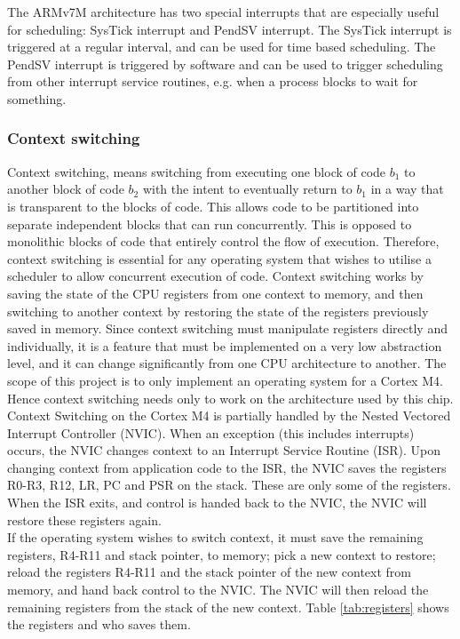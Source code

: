 The ARMv7M architecture has two special interrupts that are especially useful
for scheduling: SysTick interrupt and PendSV interrupt. The SysTick interrupt is
triggered at a regular interval, and can be used for time based scheduling. The
PendSV interrupt is triggered by software and can be used to trigger
scheduling from other interrupt service routines, e.g. when a process blocks to
wait for something.


\subsubsection{Context switching}
Context switching, means switching from executing one block of code $b_1$ to another block of code $b_2$
with the intent to eventually return to $b_1$ in a way that is transparent to the blocks of code.
This allows code to be partitioned into separate independent blocks that can run concurrently.
This is opposed to monolithic blocks of code that entirely control the flow of execution.
Therefore, context switching is essential for any operating system that wishes to utilise a scheduler to allow concurrent execution of code.
Context switching works by saving the state of the CPU registers from one context to memory,
and then switching to another context by restoring the state of the registers previously saved in memory.
Since context switching must manipulate registers directly and individually, it is a feature that must be implemented
on a very low abstraction level, and it can change significantly from one CPU architecture to another.
The scope of this project is to only implement an operating system for a Cortex M4. Hence context switching needs only
to work on the architecture used by this chip.\\

Context Switching on the Cortex M4 is partially handled by the Nested Vectored Interrupt Controller (NVIC).
When an exception (this includes interrupts) occurs, the NVIC changes context to an Interrupt Service Routine (ISR).
Upon changing context from application code to the ISR, the NVIC saves the registers R0-R3, R12, LR, PC and PSR
on the stack. These are only some of the registers.
When the ISR exits, and control is handed back to the NVIC,
the NVIC will restore these registers again.\\

If the operating system wishes to switch context, it must save the remaining registers, R4-R11 and stack pointer, to memory;
pick a new context to restore; reload the registers R4-R11 and the stack pointer of the new context from memory,
and hand back control to the NVIC. The NVIC will then reload the remaining
registers from the stack of the new context. Table \ref{tab:registers} shows the registers
and who saves them.\\

